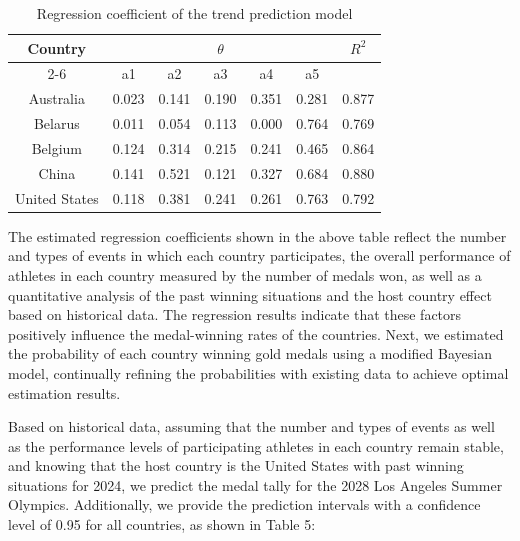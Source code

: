 \documentclass{mcmthesis}
\begin{document}
\begin{table}
\centering
\caption{Regression coefficient of the trend prediction model}
\begin{tabular}{|c|c|c|c|c|c|c|} 
\hline
\multirow{2}{*}{Country} & \multicolumn{5}{c|}{$\theta$}               & \multirow{2}{*}{$R^{2}$}  \\ 
\cline{2-6}
                         & a1    & a2    & a3    & a4    & a5    &                    \\ 
\hline
Australia                & 0.023 & 0.141 & 0.190 & 0.351 & 0.281 & 0.877              \\ 
\hline
Belarus                  & 0.011 & 0.054 & 0.113 & 0.000 & 0.764 & 0.769              \\ 
\hline
Belgium                  & 0.124 & 0.314 & 0.215 & 0.241 & 0.465 & 0.864              \\ 
\hline
China                    & 0.141 & 0.521 & 0.121 & 0.327 & 0.684 & 0.880              \\ 
\hline
United States            & 0.118 & 0.381 & 0.241 & 0.261 & 0.763 & 0.792              \\
\hline
\end{tabular}
\end{table}

The estimated regression coefficients shown in the above table reflect the number and types of events in which each country participates, the overall performance of athletes in each country measured by the number of medals won, as well as a quantitative analysis of the past winning situations and the host country effect based on historical data. The regression results indicate that these factors positively influence the medal-winning rates of the countries.
Next, we estimated the probability of each country winning gold medals using a modified Bayesian model, continually refining the probabilities with existing data to achieve optimal estimation results.

Based on historical data, assuming that the number and types of events as well as the performance levels of participating athletes in each country remain stable, and knowing that the host country is the United States with past winning situations for 2024, we predict the medal tally for the 2028 Los Angeles Summer Olympics. Additionally, we provide the prediction intervals with a confidence level of 0.95 for all countries, as shown in Table 5:
\end{document}
